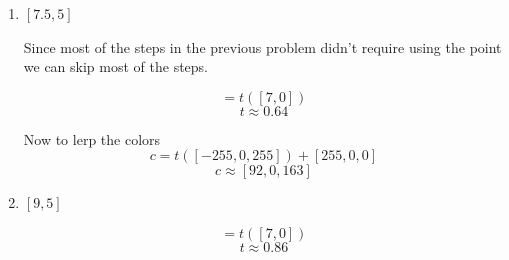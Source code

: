 \documentclass{article}
\begin{document}
\begin{enumerate}
\begin{enumerate}
\begin{mdframed}
                        Now we lerp the colors.

                        \begin{displaymath}
                            c = t(c_2 - c_1) + c_1
                        \end{displaymath}
                        \begin{displaymath}
                            c = t([-255, 0, 255]) + [255, 0, 0]
                        \end{displaymath}
                        \begin{displaymath}
                            c \approx [192, 0, 64]
                        \end{displaymath}
                    \end{mdframed}

                \item $[7.5, 5]$
                    \begin{mdframed}

                        Since most of the steps in the previous
                        problem didn't require using the
                        point we can skip most of the steps.

                        \begin{displaymath}
                            [4.5,0] = t([7,0])
                        \end{displaymath}
                        \begin{displaymath}
                            t \approx 0.64
                        \end{displaymath}

                        Now to lerp the colors
                        \begin{displaymath}
                            c = t([-255, 0, 255]) + [255, 0, 0]
                        \end{displaymath}
                        \begin{displaymath}
                            c \approx [92,0,163]
                        \end{displaymath}
                    \end{mdframed}
                    \break
                \item $[9, 5]$
                    \begin{mdframed}
                        \begin{displaymath}
                            [6, 0] = t([7,0])
                        \end{displaymath}
                        \begin{displaymath}
                            t \approx 0.86
                        \end{displaymath}


\end{mdframed}
\end{enumerate}
\end{enumerate}
\end{document}
